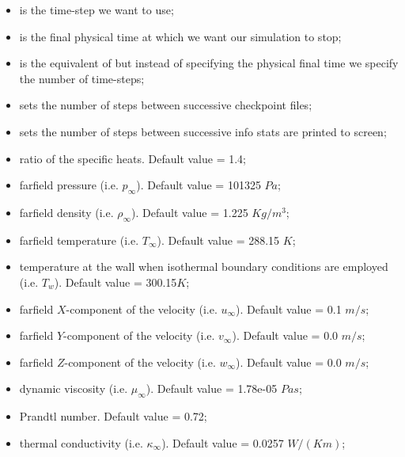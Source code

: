 \begin{itemize}
\item {} is the time-step we want to use;
\item {} is the final physical time at which we want our simulation to stop;
\item {} is the equivalent of  but instead of specifying the 
physical final time we specify the number of time-steps;
\item {} sets the number of steps between successive checkpoint files;
\item {} sets the number of steps between successive info stats are printed 
to screen;
\item {} ratio of the specific heats. Default value = 1.4;
\item {} farfield pressure (i.e. $p_{\infty}$). Default value = 101325 $Pa$;
\item {} farfield density (i.e. $\rho_{\infty}$). Default value = 1.225 $Kg/m^{3}$;
\item {} farfield temperature (i.e. $T_{\infty}$). Default value = 288.15 $K$;
\item {} temperature at the wall when isothermal boundary 
conditions are employed (i.e. $T_{w}$). Default value = 300.15$K$;
\item {} farfield $X$-component of the velocity (i.e. $u_{\infty}$). Default value = 0.1 $m/s$;
\item {} farfield $Y$-component of the velocity (i.e. $v_{\infty}$). Default value = 0.0 $m/s$;
\item {} farfield $Z$-component of the velocity (i.e. $w_{\infty}$). Default value = 0.0 $m/s$;
\item {} dynamic viscosity (i.e. $\mu_{\infty}$). Default value = 1.78e-05 $Pa s$;
\item {} Prandtl number. Default value = 0.72;
\item {} thermal conductivity (i.e. $\kappa_{\infty}$). Default value = 0.0257 $W / (K m)$;
\end{itemize}

